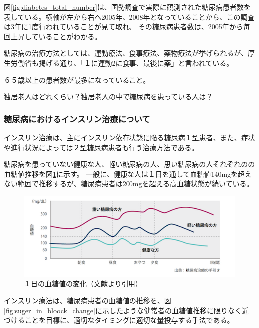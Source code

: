 図\ref{fig:diabetes_total_number}は、国勢調査で実際に観測された糖尿病患者数を表している。横軸が左から右へ2005年、2008年となっていることから、この調査は3年に1度行われていることが見て取れ、
その糖尿病患者数は、2005年から毎回上昇していることがわかる。

糖尿病の治療方法としては、運動療法、食事療法、薬物療法が挙げられるが、厚生労働省も掲げる通り、「１に運動2に食事、最後に薬」と言われている。

６５歳以上の患者数が最多になっていること。

独居老人はどれくらい？独居老人の中で糖尿病を患っている人は？

\newpage

\subsubsection{糖尿病におけるインスリン治療について}
\label{subsubsection:insulin_treatment}

インスリン治療は、主にインスリン依存状態に陥る糖尿病１型患者、また、症状や進行状況によっては２型糖尿病患者も行う治療方法である。\cite{insulin_treatment_method}

糖尿病を患っていない健康な人、軽い糖尿病の人、思い糖尿病の人それぞれのの血糖値推移を図\ref{fig:suger_in_blood_change}に示す。
一般に、健康な人は１日を通して血糖値140mgを超えない範囲で推移するが、糖尿病患者は200mgを超える高血糖状態が続いている。

\begin{figure}[htbp]
  \caption{１日の血糖値の変化（文献\cite{suger_in_blood_change}より引用）}
  \label{fig:suger_in_blood_change}
  \begin{center}
    \includegraphics[bb=0 0 500 200,width=15cm]{assets/suger_in_blood_change.png}
  \end{center}
\end{figure}

インスリン療法は、糖尿病患者の血糖値の推移を、図\ref{fig:suger_in_bloock_change}に示したような健常者の血糖値推移に限りなく近づけることを目標に、適切なタイミングに適切な量投与する手法である。

